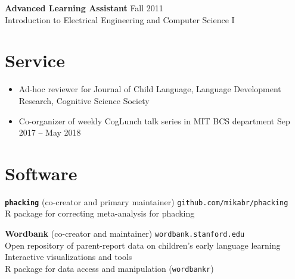\documentclass[11pt,]{article}
\providecommand{\tightlist}{%
  \setlength{\itemsep}{0pt}\setlength{\parskip}{0pt}}
\begin{document}
\textbf{Advanced Learning Assistant} \hfill Fall 2011\\
\hspace*{0.333em}\hspace*{0.333em}\hspace*{0.333em}\hspace*{0.333em}Introduction
to Electrical Engineering and Computer Science I

\hypertarget{service}{%
\section{Service}\label{service}}

\begin{itemize}
\tightlist
\item
  Ad-hoc reviewer for Journal of Child Language, Language Development
  Research, Cognitive Science Society
\item
  Co-organizer of weekly CogLunch talk series in MIT BCS department
  \hfill Sep 2017 -- May 2018
\end{itemize}

\hypertarget{software}{%
\section{Software}\label{software}}

\textbf{\texttt{phacking}} (co-creator and primary maintainer)
\hfill \texttt{github.com/mikabr/phacking}\\
\hspace*{0.333em}\hspace*{0.333em}\hspace*{0.333em}R package for
correcting meta-analysis for phacking

\textbf{Wordbank} (co-creator and maintainer)
\hfill \texttt{wordbank.stanford.edu}\\
\hspace*{0.333em}\hspace*{0.333em}\hspace*{0.333em}Open repository of
parent-report data on children's early language learning \\
\hspace*{0.333em}\hspace*{0.333em}\hspace*{0.333em}Interactive
visualizations and tools \\
\hspace*{0.333em}\hspace*{0.333em}\hspace*{0.333em}R package for data
access and manipulation (\texttt{wordbankr})
\end{document}
